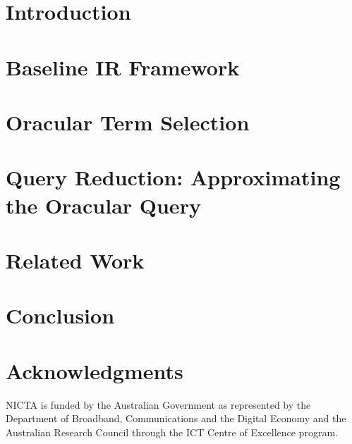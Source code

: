 \documentclass{sig-alternate-2013}
\begin{document}
\section{Introduction}


\section{Baseline IR Framework}
\label{Sec:BaselineIRFramework}


\section{Oracular Term Selection}
\label{Sec:OracularTermSelection}


\section{Query Reduction: Approximating the Oracular Query}
\label{Sec:QueryReduction}


\section{Related Work}
\label{Sec:RelatedWork}


\section{Conclusion}
\label{Sec:Conclusion}


\section{Acknowledgments}
NICTA is funded by the Australian Government as represented by the Department of Broadband, Communications and the Digital Economy and the Australian Research Council through the ICT Centre of Excellence program.
\end{document}
